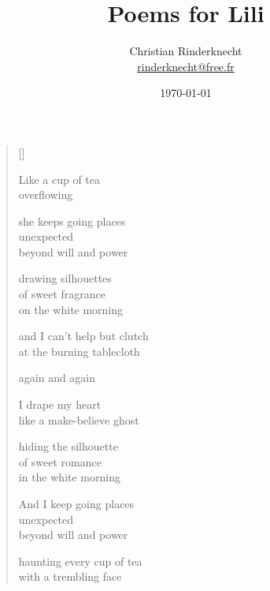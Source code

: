 \documentclass[12pt,a4paper]{article}
\title{Poems for Lili}
\author{Christian Rinderknecht\\
{\small \url{rinderknecht@free.fr}}}
\date{\today}
\begin{document}

\thispagestyle{empty}

\poemtitle{}

\settowidth{\versewidth}{Like a make-believe ghost}

\bigskip

\begin{verse}[\versewidth]

Like a cup of tea \\
overflowing

she keeps going places \\
unexpected \\
beyond will and power

drawing silhouettes \\
of sweet fragrance \\
on the white morning

and I can't help but clutch \\
at the burning tablecloth

again and again

I drape my heart \\
like a make-believe ghost

hiding the silhouette \\
of sweet romance \\
in the white morning

And I keep going places \\
unexpected \\
beyond will and power

haunting every cup of tea \\
with a trembling face
\end{verse}
\end{document}
